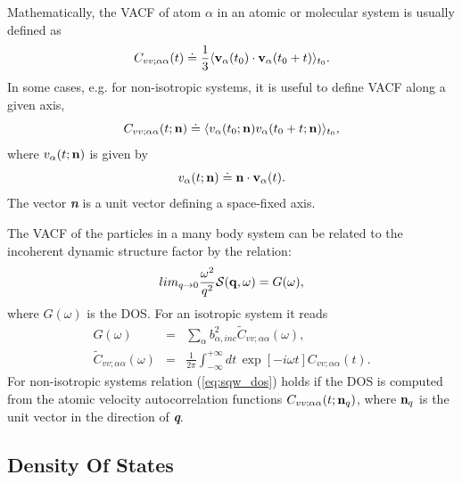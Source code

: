 \documentclass[a4paper,11pt]{article}
\begin{document}
Mathematically, the \gls{VACF} of atom $\alpha$ in an atomic or molecular system is usually defined as
\begin{equation}
\label{eq:vacf}
C_{vv ; \alpha\alpha}(t) \doteq
\frac{1}{3}\langle {\bf v}_\alpha(t_0)\cdot{\bf v}_\alpha(t_0+t)\rangle_{t_0}.
\end{equation}
In some cases, e.g. for non-isotropic systems, it is useful to define \gls{VACF} along a given axis,
\begin{equation}
\label{eq:vacf_n}
C_{vv ; \alpha\alpha}(t;{\bf n}) \doteq
\langle v_\alpha(t_0;{\bf n})v_\alpha(t_0+t;{\bf n})\rangle_{t_0},
\end{equation}
where $v_\alpha(t;{\bf n})$ is given by
\begin{equation}
v_\alpha(t;{\bf n}) \doteq
{\bf n}\cdot{\bf v}_{\alpha}(t).
\end{equation}
The vector \textit{\textbf{n}} is a unit vector defining a space-fixed axis.

The \gls{VACF} of the particles in a many body system can be related to the
incoherent dynamic structure factor by the relation:
\begin{equation}
\label{eq:sqw_dos}
lim_{q\to 0} \frac{\omega^2}{q^2}{\cal S}({\bf q},\omega) =
G(\omega),
\end{equation}
where $G(\omega)$ is the \gls{DOS}. For an isotropic system it reads
\begin{eqnarray}
\label{eq:dos}
G(\omega) &= &\sum\limits_{\alpha}b^2_{\alpha,inc}
\tilde C_{vv ; \alpha\alpha}(\omega),\\
\label{eq:dos_alpha}
\tilde C_{vv ; \alpha\alpha}(\omega) &= &
\frac{1}{2\pi}\int_{-\infty}^{+\infty}dt\, \exp[-i\omega t]
C_{vv ; \alpha\alpha}(t).
\end{eqnarray}
For non-isotropic systems relation (\ref{eq:sqw_dos}) holds if the \gls{DOS} is computed from the atomic velocity
autocorrelation functions $C_{vv ; \alpha\alpha}(t;{\bf n}_q)$, where ${\bf n}_q$ is the unit vector in the
direction of \textit{\textbf{q}}.

\subsection{Density Of States}
\label{dos}
\end{document}
